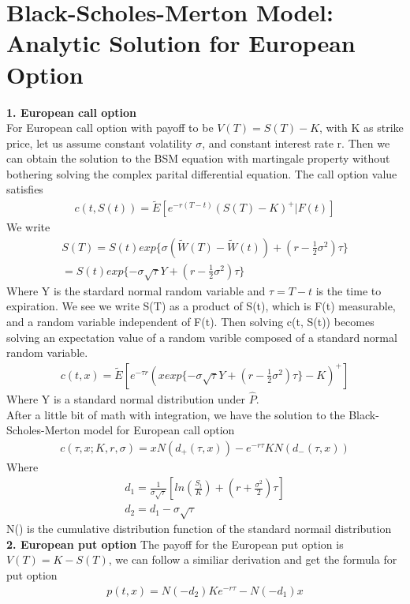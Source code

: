 \documentclass[a4paper]{article}
\begin{document}
\section{Black-Scholes-Merton Model: Analytic Solution for European Option}
{\bf1. European call option}\\
For European call option with payoff to be $V(T) = S(T) - K$, with K as strike price, let us assume constant volatility $\sigma$, and constant interest rate r. 
Then we can obtain the solution to the BSM equation with martingale property without bothering solving the complex parital
differential equation. The call option value satisfies
\begin{align*}
	c(t, S(t)) = \tilde E[e^{-r(T-t)}(S(T)-K)^+|F(t)]
\end{align*}
We write
\begin{align*}
	S(T) = S(t) exp\{\sigma(\tilde W(T) -\tilde W(t)) + (r - \frac{1}{2} \sigma^2) \tau\} \\
	     = S(t) exp\{-\sigma \sqrt{\tau} Y + (r - \frac{1}{2}\sigma^2)\tau\}
\end{align*}
Where Y is the stardard normal random variable and $\tau = T - t$ is the time to expiration. We see we write S(T) as a product of S(t), which is F(t) measurable, and a random variable independent of F(t).
Then solving c(t, S(t)) becomes solving an expectation value of a random varible composed of a standard normal random variable. 
\begin{align*}
	c(t,x) = \tilde E[e^{-\tau r}(x exp\{-\sigma \sqrt{\tau} Y + (r -\frac{1}{2}\sigma^2)\tau\}-K)^+]
\end{align*}
Where Y is a standard normal distribution under $\hat P$.\\
After a little bit of math with integration, we have the solution to the Black-Scholes-Merton model for European call option
\begin{align*}
	c(\tau,x; K,r,\sigma) = xN(d_{+}(\tau,x)) - e^{-r\tau}KN(d_{-}(\tau,x))
\end{align*}
Where
\begin{align*}
	d_1 = \frac{1}{\sigma \sqrt{\tau}}[ln(\frac{S_t}{K}) + (r+ \frac{\sigma^2}{2})\tau] \\
	d_2 = d_1 - \sigma \sqrt{\tau}
\end{align*}
N() is the cumulative distribution function of the standard normail distribution
{\bf 2. European put option}
The payoff for the European put option is $V(T) = K - S(T)$, we can follow a similiar derivation and get the formula for put option
\begin{align*}
	p(t,x) = N(-d_2)Ke^{-r\tau} -N(-d_1)x
\end{align*}
\end{document}

